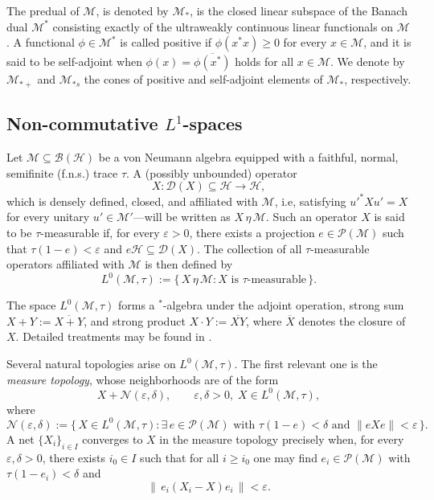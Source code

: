 \documentclass[11pt]{amsart}
\theoremstyle{definition}
\theoremstyle{myremark}
\numberwithin{equation}{section}
\begin{document}
    

The predual of \(\mathcal{M}\), is denoted by \(\mathcal{M}_*\), is the closed linear subspace of the Banach dual \(\mathcal{M}^*\) consisting exactly of the ultraweakly continuous linear functionals on \(\mathcal{M}\). A functional \(\phi \in \mathcal{M}^*\) is called positive if \(\phi(x^{*}x) \geq 0\) for every \(x \in \mathcal{M}\), and it is said to be self-adjoint when \(\phi(x) = \overline{\phi(x^{*})}\) holds for all \(x \in \mathcal{M}\). We denote by \(\mathcal{M}_{*+}\) and \(\mathcal{M}_{*s}\) the cones of positive and self-adjoint elements of \(\mathcal{M}_*\), respectively.\\


    


\subsection{\textbf{Non-commutative $L^1$-spaces}}



Let \(\mathcal{M} \subseteq \mathcal{B}(\mathcal{H})\) be a von Neumann algebra equipped with a faithful, normal, semifinite (f.n.s.) trace \(\tau\). A (possibly unbounded) operator 
\[
X : \mathcal{D}(X) \subseteq \mathcal{H} \to \mathcal{H},
\]
which is densely defined, closed, and affiliated with \(\mathcal{M}\), i.e,  satisfying \(u'^{*} X u' = X\) for every unitary \(u' \in \mathcal{M}'\)—will be written as \(X \,\eta\, \mathcal{M}\). Such an operator \(X\) is said to be \(\tau\)-measurable if, for every \(\varepsilon > 0\), there exists a projection \(e \in \mathcal{P}(\mathcal{M})\) such that \(\tau(1-e) < \varepsilon\) and \(e\mathcal{H} \subseteq \mathcal{D}(X)\). The collection of all \(\tau\)-measurable operators affiliated with \(\mathcal{M}\) is then defined by
\[
L^{0}(\mathcal{M},\tau) := \{\, X \,\eta\, \mathcal{M} : X \text{ is } \tau\text{-measurable}\,\}.
\]

The space \(L^{0}(\mathcal{M},\tau)\) forms a \(^*\)-algebra under the adjoint operation, strong sum \(X+Y := \overline{X+Y}\), and strong product \(X \cdot Y := \overline{XY}\), where \(\overline{X}\) denotes the closure of \(X\). Detailed treatments may be found in \cite{stratila2019lectures, hiai2021lectures}.

Several natural topologies arise on \(L^{0}(\mathcal{M},\tau)\). The first relevant one is the \emph{measure topology}, whose neighborhoods are of the form
\[
X + \mathcal{N}(\varepsilon,\delta),
\qquad \varepsilon,\delta > 0,\; X \in L^{0}(\mathcal{M},\tau),
\]
where
\[
\mathcal{N}(\varepsilon,\delta)
 := \{\, X \in L^{0}(\mathcal{M},\tau) : \exists\, e \in \mathcal{P}(\mathcal{M}) 
 \text{ with } \tau(1-e) < \delta \text{ and } \|eXe\| < \varepsilon \,\}.
\]
A net \(\{X_i\}_{i\in I}\) converges to \(X\) in the measure topology precisely when, for every \(\varepsilon,\delta>0\), there exists \(i_0\in I\) such that for all \(i\ge i_0\) one may find \(e_i\in \mathcal{P}(\mathcal{M})\) with \(\tau(1-e_i) < \delta\) and
\[
\|\, e_i (X_i - X)e_i \,\| < \varepsilon.
\]
\end{document}
